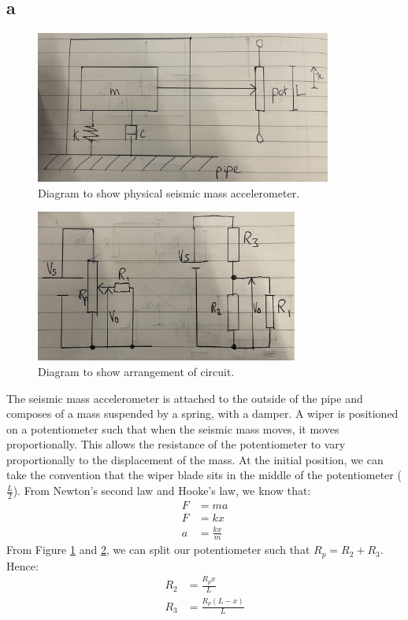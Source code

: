 \documentclass[11pt]{article}
\numberwithin{equation}{section}
\begin{document}
\subsection{a}
\begin{figure}[H]
    \centering
    \includegraphics[height = 5cm]{./img/q3i1.jpg}
    \caption{Diagram to show physical seismic mass accelerometer.} 
    \label{fig:q3i1}
\end{figure}
\begin{figure}[H]
    \centering
    \includegraphics[height = 5cm]{./img/q3i2.jpg}
    \caption{Diagram to show arrangement of circuit.} 
    \label{fig:q3i2}
\end{figure}
The seismic mass accelerometer is attached to the outside of the pipe and composes of a mass suspended by a spring, with a damper. A wiper is positioned on a potentiometer such that when the seismic mass moves, it moves proportionally. This allows the resistance of the potentiometer to vary proportionally to the displacement of the mass. At the initial position, we can take the convention that the wiper blade sits in the middle of the potentiometer ($\frac{L}{2}$). From Newton's second law and Hooke's law, we know that:
\begin{align}
    F &= ma\\
    F &= kx\\
    a &= \frac{kx}{m} \label{eq:q3i5}
\end{align}
From Figure \ref{fig:q3i1} and \ref{fig:q3i2}, we can split our potentiometer such that $R_p = R_2 + R_3$. Hence:
\begin{align}
    R_2 &= \frac{R_p x}{L}\label{eq:q3i1}\\
    R_3 &= \frac{R_p (L-x)}{L}\label{eq:q3i2}
\end{align} 
\end{document}
